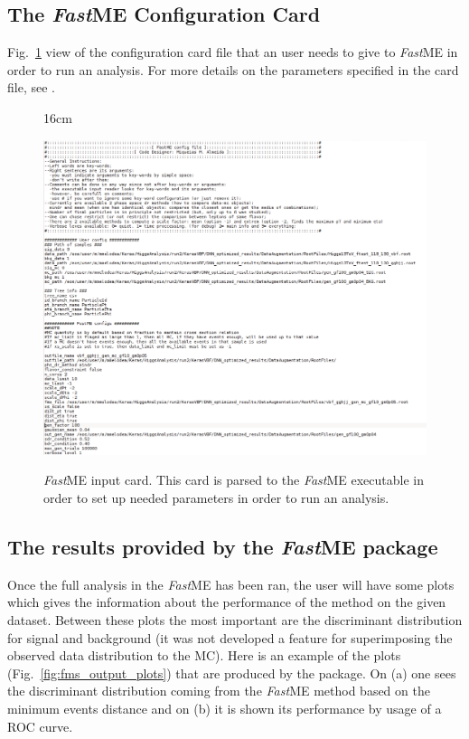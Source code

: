\subsection{The \textit{Fast}ME Configuration Card \label{subsec:fme_config_card}}
Fig.~\ref{fig:fastme_input_card} view of the configuration card file that an user needs to give to \textit{Fast}ME in order to run an analysis. For more details on the parameters specified in the card file, see \cite{bib:fastme_package}.

\begin{figure}[h!]{16cm}
\caption{\textit{Fast}ME input card. This card is parsed to the \textit{Fast}ME executable in order to set up needed parameters in order to run an analysis.}
\includegraphics[angle=90,scale=0.7,trim={0cm 0cm 0cm 0cm},clip]{AppendixFastME/figs/fme_config_card}
\label{fig:fastme_input_card}
\end{figure}


\subsection{The results provided by the \textit{Fast}ME package}
Once the full analysis in the \textit{Fast}ME has been ran, the user will have some plots which gives the information about the performance of the method on the given dataset. Between these plots the most important are the discriminant distribution for signal and background (it was not developed a feature for superimposing the observed data distribution to the MC). Here is an example of the plots (Fig.~\ref{fig:fms_output_plots}) that are produced by the package. On (a) one sees the discriminant distribution coming from the \textit{Fast}ME method based on the minimum events distance and on (b) it is shown its performance by usage of a ROC curve.

